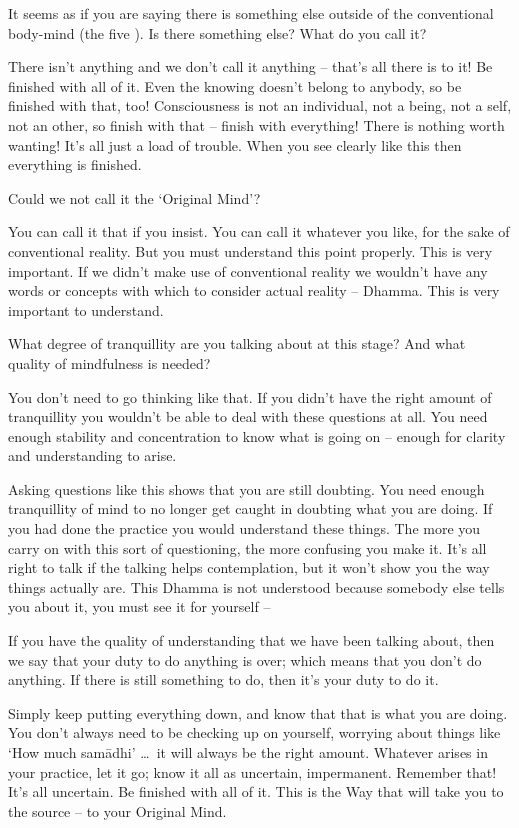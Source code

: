 It seems as if you are saying there is something else outside of the conventional body-mind (the five ). Is there something else? What do you call it?

There isn't anything and we don't call it anything -- that's all there is to it! Be finished with all of it. Even the knowing doesn't belong to anybody, so be finished with that, too! Consciousness is not an individual, not a being, not a self, not an other, so finish with that -- finish with everything! There is nothing worth wanting! It's all just a load of trouble. When you see clearly like this then everything is finished.

Could we not call it the `Original Mind'?

You can call it that if you insist. You can call it whatever you like, for the sake of conventional reality. But you must understand this point properly. This is very important. If we didn't make use of conventional reality we wouldn't have any words or concepts with which to consider actual reality -- Dhamma. This is very important to understand.

What degree of tranquillity are you talking about at this stage? And what quality of mindfulness is needed?

You don't need to go thinking like that. If you didn't have the right amount of tranquillity you wouldn't be able to deal with these questions at all. You need enough stability and concentration to know what is going on -- enough for clarity and understanding to arise.

Asking questions like this shows that you are still doubting. You need enough tranquillity of mind to no longer get caught in doubting what you are doing. If you had done the practice you would understand these things. The more you carry on with this sort of questioning, the more confusing you make it. It's all right to talk if the talking helps contemplation, but it won't show you the way things actually are. This Dhamma is not understood because somebody else tells you about it, you must see it for yourself -- 

If you have the quality of understanding that we have been talking about, then we say that your duty to do anything is over; which means that you don't do anything. If there is still something to do, then it's your duty to do it.

Simply keep putting everything down, and know that that is what you are doing. You don't always need to be checking up on yourself, worrying about things like `How much sam\=adhi' \ldots\ it will always be the right amount. Whatever arises in your practice, let it go; know it all as uncertain, impermanent. Remember that! It's all uncertain. Be finished with all of it. This is the Way that will take you to the source -- to your Original Mind.

